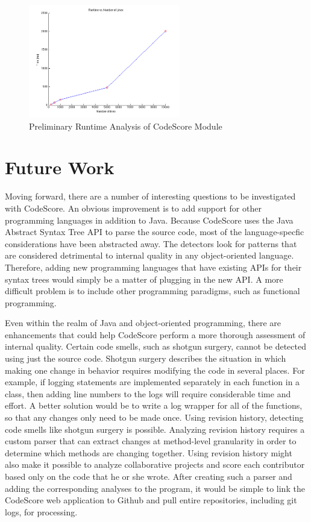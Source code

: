 \documentclass{sig-alternate}
\begin{document}
\begin{figure}[ht]
	\begin{center}
		\includegraphics[width=250px]{CodeScoreRuntimeGraph}
	\end{center}
	\vspace{-12pt}
	\caption{Preliminary Runtime Analysis of CodeScore Module}
	\label{fig:runtime}
\end{figure}

\section {Future Work}
Moving forward, there are a number of interesting questions to be investigated
with CodeScore. An obvious improvement is to add support for other programming
languages in addition to Java. Because CodeScore uses the Java Abstract Syntax
Tree API to parse the source code, most of the language-specfic considerations
have been abstracted away. The detectors look for patterns that are considered
detrimental to internal quality in any object-oriented language. Therefore, adding new programming
languages that have existing APIs for their syntax trees would simply be a
matter of plugging in the new API. A more difficult problem is to include other
programming paradigms, such as functional programming.

Even within the realm of Java and object-oriented programming, there are
enhancements that could help CodeScore perform a more thorough assessment of
internal quality.
Certain code smells, such as shotgun surgery, cannot be detected using just the
source code. Shotgun surgery describes the situation in which making one
change in behavior requires modifying the code in several places. For
example, if logging statements are implemented separately in each function in a
class, then adding line numbers to the logs will require considerable time and effort. A
better solution would be to write a log wrapper for all of the functions, so
that any changes only need to be made once. 
Using
revision history, detecting code smells like shotgun surgery is possible. Analyzing revision
history requires a custom parser that can extract changes at method-level
granularity in order to determine which methods are changing together. Using
revision history might also make it possible to analyze collaborative projects
and score each contributor based only on the code that he or she wrote. After
creating such a parser and adding the corresponding analyses to the program, it 
would be simple to link the CodeScore web application to Github and pull entire repositories,
including git logs, for processing. 
\end{document}
